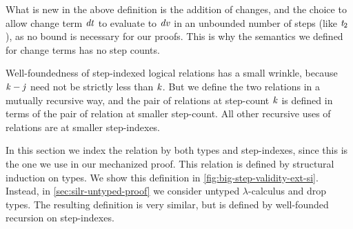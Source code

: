 What is new in the above definition is the addition of changes, and the choice
to allow change term \ensuremath{\Varid{dt}} to evaluate to \ensuremath{\Varid{dv}} in an unbounded number of steps
(like \ensuremath{\Varid{t}_{2}}), as no bound is necessary for our proofs.
This is why the semantics we defined for change terms has no step counts.

Well-foundedness of step-indexed logical relations has a small wrinkle, because
\ensuremath{\Varid{k}\mathbin{-}\Varid{j}} need not be strictly less than \ensuremath{\Varid{k}}. But we define the two relations in a
mutually recursive way, and the pair of relations at step-count \ensuremath{\Varid{k}} is defined
in terms of the pair of relation at smaller step-count. All other recursive uses
of relations are at smaller step-indexes.


In this section we index the relation by both types and step-indexes,
since this is the one we use in our mechanized proof. This
relation is defined by structural induction on types.
We show this definition in \cref{fig:big-step-validity-ext-si}.
Instead, in \cref{sec:silr-untyped-proof} we consider
untyped $\lambda$-calculus and drop types.
The resulting definition is very similar, but is defined by
well-founded recursion on step-indexes.

